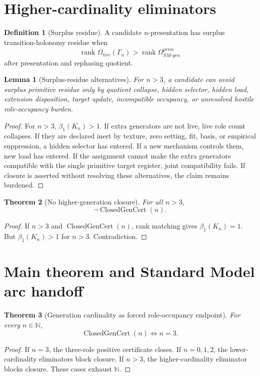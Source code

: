 \documentclass[11pt]{article}
\newcommand{\ClosedGenCert}{\operatorname{ClosedGenCert}}
\newcommand{\rank}{\operatorname{rank}}
\theoremstyle{definition}
\newtheorem{definition}{Definition}[section]
\theoremstyle{plain}
\newtheorem{theorem}{Theorem}[section]
\newtheorem{lemma}[theorem]{Lemma}
\theoremstyle{remark}
\begin{document}
\section{Higher-cardinality eliminators}

\begin{definition}[Surplus residue]
A candidate \(n\)-presentation has surplus transition-holonomy residue when
\[
\rank\Omega_{live}(\Gamma_n)>\rank\Omega_{SM\text{-}gen}^{prim}
\]
after presentation and rephasing quotient.
\end{definition}

\begin{lemma}[Surplus-residue alternatives]
For \(n>3\), a candidate can avoid surplus primitive residue only by quotient collapse, hidden selector, hidden load, extension disposition, target update, incompatible occupancy, or unresolved hostile role-occupancy burden.
\end{lemma}
\begin{proof}
For \(n>3\), \(\beta_1(K_n)>1\). If extra generators are not live, live role count collapses. If they are declared inert by texture, zero setting, fit, basis, or empirical suppression, a hidden selector has entered. If a new mechanism controls them, new load has entered. If the assignment cannot make the extra generators compatible with the single primitive target register, joint compatibility fails. If closure is asserted without resolving these alternatives, the claim remains burdened.
\end{proof}

\begin{theorem}[No higher-generation closure]
For all \(n>3\),
\[
\neg\ClosedGenCert(n).
\]
\end{theorem}
\begin{proof}
If \(n>3\) and \(\ClosedGenCert(n)\), rank matching gives \(\beta_1(K_n)=1\). But \(\beta_1(K_n)>1\) for \(n>3\). Contradiction.
\end{proof}

\section{Main theorem and Standard Model arc handoff}

\begin{theorem}[Generation cardinality as forced role-occupancy endpoint]
For every \(n\in\mathbb N\),
\[
\ClosedGenCert(n)\Longleftrightarrow n=3.
\]
\end{theorem}
\begin{proof}
If \(n=3\), the three-role positive certificate closes. If \(n=0,1,2\), the lower-cardinality eliminators block closure. If \(n>3\), the higher-cardinality eliminator blocks closure. These cases exhaust \(\mathbb N\).
\end{proof}
\end{document}
